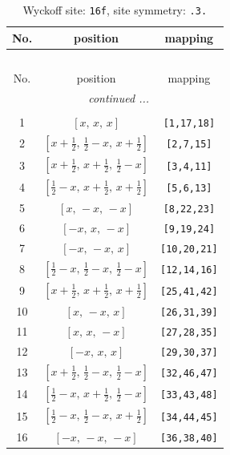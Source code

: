 \documentclass[fleqn,8pt]{jsarticle}
\begin{document}
\begin{longtable}{ccc}
\caption{Wyckoff site: {\tt 16f}, site symmetry: {\tt .3.}}
 \\
 \hline \hline
No. & position & mapping \\ \hline \endfirsthead

\multicolumn{2}{l}{\tablename\ \thetable{}} \\
 \hline \hline
No. & position & mapping \\ \hline \endhead

 \hline \hline
\multicolumn{2}{r}{\footnotesize\it continued ...} \\ \endfoot

 \hline \hline
\multicolumn{2}{r}{} \\ \endlastfoot

1 & $\left[ x,\, x,\, x \right]$ & {\tt [1,17,18]} \\ \hline
2 & $\left[ x + \frac{1}{2},\, \frac{1}{2} - x,\, x + \frac{1}{2} \right]$ & {\tt [2,7,15]} \\ \hline
3 & $\left[ x + \frac{1}{2},\, x + \frac{1}{2},\, \frac{1}{2} - x \right]$ & {\tt [3,4,11]} \\ \hline
4 & $\left[ \frac{1}{2} - x,\, x + \frac{1}{2},\, x + \frac{1}{2} \right]$ & {\tt [5,6,13]} \\ \hline
5 & $\left[ x,\, - x,\, - x \right]$ & {\tt [8,22,23]} \\ \hline
6 & $\left[ - x,\, x,\, - x \right]$ & {\tt [9,19,24]} \\ \hline
7 & $\left[ - x,\, - x,\, x \right]$ & {\tt [10,20,21]} \\ \hline
8 & $\left[ \frac{1}{2} - x,\, \frac{1}{2} - x,\, \frac{1}{2} - x \right]$ & {\tt [12,14,16]} \\ \hline
9 & $\left[ x + \frac{1}{2},\, x + \frac{1}{2},\, x + \frac{1}{2} \right]$ & {\tt [25,41,42]} \\ \hline
10 & $\left[ x,\, - x,\, x \right]$ & {\tt [26,31,39]} \\ \hline
11 & $\left[ x,\, x,\, - x \right]$ & {\tt [27,28,35]} \\ \hline
12 & $\left[ - x,\, x,\, x \right]$ & {\tt [29,30,37]} \\ \hline
13 & $\left[ x + \frac{1}{2},\, \frac{1}{2} - x,\, \frac{1}{2} - x \right]$ & {\tt [32,46,47]} \\ \hline
14 & $\left[ \frac{1}{2} - x,\, x + \frac{1}{2},\, \frac{1}{2} - x \right]$ & {\tt [33,43,48]} \\ \hline
15 & $\left[ \frac{1}{2} - x,\, \frac{1}{2} - x,\, x + \frac{1}{2} \right]$ & {\tt [34,44,45]} \\ \hline
16 & $\left[ - x,\, - x,\, - x \right]$ & {\tt [36,38,40]} \\
\end{longtable}
\end{document}
